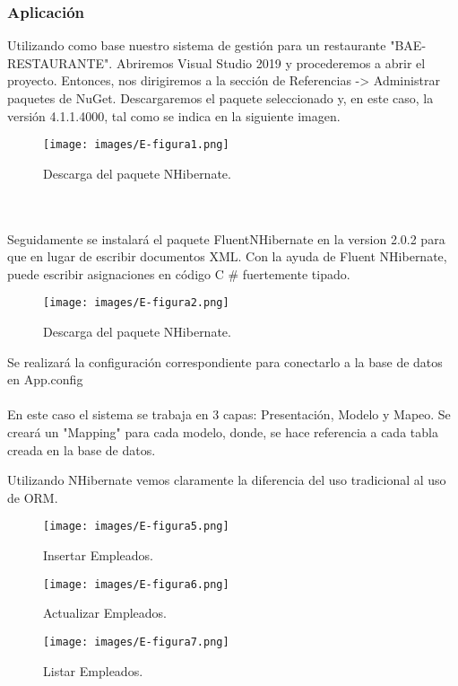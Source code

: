 \documentclass{article}
\begin{document}
\subsubsection{Aplicación}
Utilizando como base nuestro sistema de gestión para un restaurante "BAE-RESTAURANTE". Abriremos Visual Studio 2019 y procederemos a abrir el proyecto.
Entonces, nos dirigiremos a la sección de Referencias -> Administrar paquetes de NuGet.
Descargaremos el paquete seleccionado y, en este caso, la versión 4.1.1.4000, tal como se indica en la siguiente imagen.

\begin{figure}[ht]
    \centering     
    \texttt{[image: images/E-figura1.png]}
    \caption{Descarga del paquete NHibernate.}
    \label{fig:BiasVoltage}
\end{figure}

\\\\Seguidamente se instalará el paquete FluentNHibernate en la version 2.0.2 para que en lugar de escribir documentos XML. Con la ayuda de Fluent NHibernate, puede escribir asignaciones en código C # fuertemente tipado.
\begin{figure}[ht]
    \centering     
    \texttt{[image: images/E-figura2.png]}
    \caption{Descarga del paquete NHibernate.}
    \label{fig:BiasVoltage}
\end{figure}
Se realizará la configuración correspondiente para conectarlo a la base de datos en App.config
\\\\
En este caso el sistema se trabaja en 3 capas: Presentación, Modelo y Mapeo. Se creará un "Mapping" para cada modelo, donde, se hace referencia a cada tabla creada en la base de datos.

Utilizando NHibernate vemos claramente la diferencia del uso tradicional al uso de ORM.
\begin{figure}[ht]
    \centering     
    \texttt{[image: images/E-figura5.png]}
    \caption{Insertar Empleados.}
    \label{fig:BiasVoltage}
\end{figure}
\begin{figure}[ht]
    \centering     
    \texttt{[image: images/E-figura6.png]}
    \caption{Actualizar Empleados.}
    \label{fig:BiasVoltage}
\end{figure}
\begin{figure}[ht]
    \centering     
    \texttt{[image: images/E-figura7.png]}
    \caption{Listar Empleados.}
    \label{fig:BiasVoltage}
\end{figure}
\newpage
\end{document}
